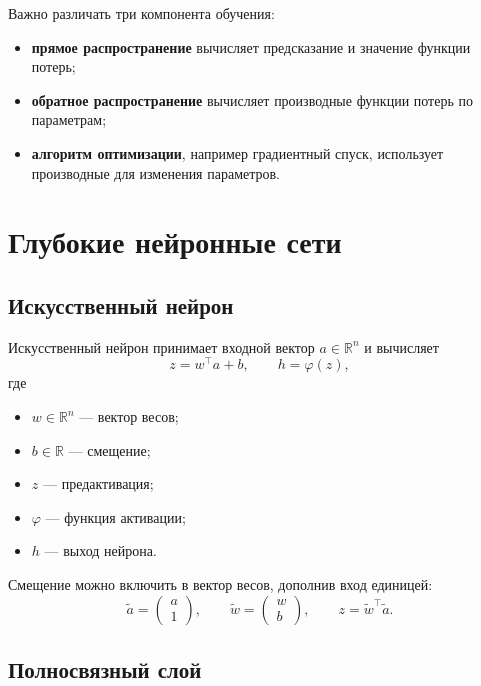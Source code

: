 \documentclass[12pt,a4paper]{article}
\theoremstyle{plain}
\theoremstyle{definition}
\theoremstyle{remark}
\newcommand{\R}{\mathbb{R}}
\begin{document}
Важно различать три компонента обучения:

\begin{itemize}
    \item \textbf{прямое распространение} вычисляет предсказание и
    значение функции потерь;
    \item \textbf{обратное распространение} вычисляет производные
    функции потерь по параметрам;
    \item \textbf{алгоритм оптимизации}, например градиентный спуск,
    использует производные для изменения параметров.
\end{itemize}

\section{Глубокие нейронные сети}

\subsection{Искусственный нейрон}

Искусственный нейрон принимает входной вектор
$a\in\R^n$ и вычисляет
\[
    z=w^\top a+b,
    \qquad
    h=\varphi(z),
\]
где

\begin{itemize}
    \item $w\in\R^n$ --- вектор весов;
    \item $b\in\R$ --- смещение;
    \item $z$ --- предактивация;
    \item $\varphi$ --- функция активации;
    \item $h$ --- выход нейрона.
\end{itemize}

Смещение можно включить в вектор весов, дополнив вход единицей:
\[
    \widetilde{a}
    =
    \begin{pmatrix}
        a\\
        1
    \end{pmatrix},
    \qquad
    \widetilde{w}
    =
    \begin{pmatrix}
        w\\
        b
    \end{pmatrix},
    \qquad
    z=\widetilde{w}^{\top}\widetilde{a}.
\]

\subsection{Полносвязный слой}
\end{document}
